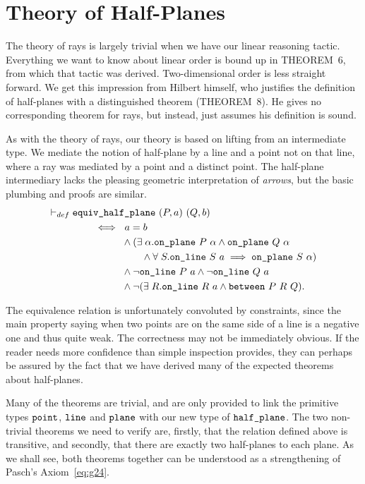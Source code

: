 \section{Theory of Half-Planes}\label{sec:HalfPlaneTheory}
The theory of rays is largely trivial when we have our linear reasoning tactic. Everything we want to know about linear order is bound up in THEOREM~6, from which that tactic was derived. Two-dimensional order is less straight forward. We get this impression from Hilbert himself, who justifies the definition of half-planes with a distinguished theorem (THEOREM~8). He gives no corresponding theorem for rays, but instead, just assumes his definition is sound.

As with the theory of rays, our theory is based on lifting from an intermediate type. We mediate the notion of half-plane by a line and a point not on that line, where a ray was mediated by a point and a distinct point. The half-plane intermediary lacks the pleasing geometric interpretation of \emph{arrows}, but the basic plumbing and proofs are similar.
\begin{equation}\label{eq:SameSidePlaneDef}
  \begin{split}
    \vdash_{def}\;& \code{equiv\_half\_plane}\ (P,a)\ (Q,b)\\
    & \qquad\iff\ a=b \\
    & \qquad\quad\qquad \wedge (\exists\; \alpha. \code{on\_plane}\ P\ \alpha \wedge \code{on\_plane}\ Q\ \alpha\\
    & \qquad\quad\qquad\qquad \wedge \forall\;S. \code{on\_line}\ S\ a \implies \code{on\_plane}\ S\ \alpha)\\
    & \qquad\quad\qquad \wedge \neg\code{on\_line}\ P\ a \wedge \neg\code{on\_line}\ Q\ a\\
    & \qquad\quad\qquad \wedge \neg(\exists\; R. \code{on\_line}\ R\ a \wedge \between{P}{R}{Q}).
  \end{split}
\end{equation}

The equivalence relation is unfortunately convoluted by constraints, since the main property saying when two points are on the same side of a line is a negative one and thus quite weak. The correctness may not be immediately obvious. If the reader needs more confidence than simple inspection provides, they can perhaps be assured by the fact that we have derived many of the expected theorems about half-planes. 

Many of the theorems are trivial, and are only provided to link the primitive types $\texttt{point}$, $\texttt{line}$ and $\texttt{plane}$ with our new type of $\texttt{half\_plane}$. The two non-trivial theorems we need to verify are, firstly, that the relation defined above is transitive, and secondly, that there are exactly two half-planes to each plane. As we shall see, both theorems together can be understood as a strengthening of Pasch's Axiom~\eqref{eq:g24}.


